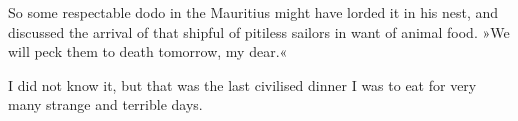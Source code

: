 So some respectable dodo in the Mauritius might have lorded it in his nest, and discussed the arrival of that shipful of pitiless sailors in want of animal food. »We will peck them to death tomorrow, my dear.«

I did not know it, but that was the last civilised dinner I was to eat for very many strange and terrible days.

